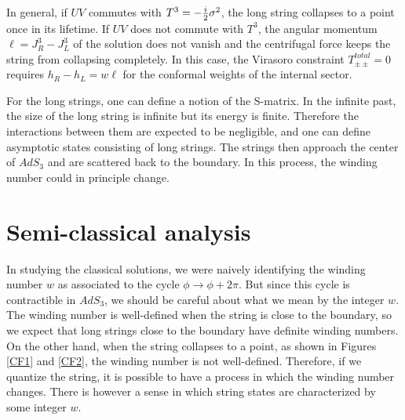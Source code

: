 In general, if $U V $ commutes with $T^3 = -{i\over 2}\sigma^2$,
the long string collapses to a point once in its lifetime. 
If $UV$ does not commute with $T^3$, the angular momentum
$\ell = J_R^3 -J_L^3$ of the solution does not vanish and the
centrifugal force keeps the string from collapsing completely. 
In this case, the Virasoro constraint $T^{total}_{\pm\pm}=0$
requires $h_R - h_L = w \ell$ for the conformal weights of
the internal sector.  

For the long strings, one can define a notion of the S-matrix. 
In the infinite past, the size of the long string is infinite
but its energy is finite. Therefore the interactions between them 
are expected to be negligible, and one can define asymptotic
states consisting of long strings. The strings then approach 
the center of $AdS_3$ and are scattered back to the boundary.   
In this process, the winding number could in principle change.



\section{Semi-classical analysis}

In studying the classical solutions, we were naively identifying the 
winding number $w$  as associated to the cycle 
$\phi \rightarrow \phi+ 2\pi$. But since this cycle is contractible
in $AdS_3$, we should be careful about what we mean by the
integer $w$.
The winding number is well-defined when the string is close to the
boundary, so we expect that long strings close to the 
boundary have definite winding numbers. On the other hand, 
when the string collapses to a point,
as shown in Figures \ref{CF1} and \ref{CF2}, the winding
number is not well-defined. Therefore, if we quantize
the string, it is possible to have a process in which
the winding number changes.
There is however a sense in which string states are characterized by
some integer $w$. 

